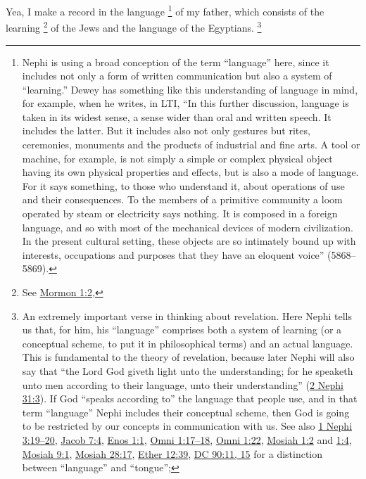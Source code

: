 			Yea, I make a record in the language%
				\footnote{%
					Nephi is using a broad conception of the term ``language'' here, since it includes not only a form of written communication but also a system of ``learning.'' Dewey has something like this understanding of language in mind, for example, when he writes, in LTI, ``In this further discussion, language is taken in its widest sense, a sense wider than oral and written speech. It includes the latter. But it includes also not only gestures but rites, ceremonies, monuments and the products of industrial and fine arts. A tool or machine, for example, is not simply a simple or complex physical object having its own physical properties and effects, but is also a mode of language. For it says something, to those who understand it, about operations of use and their consequences. To the members of a primitive community a loom operated by steam or electricity says nothing. It is composed in a foreign language, and so with most of the mechanical devices of modern civilization. In the present cultural setting, these objects are so intimately bound up with interests, occupations and purposes that they have an eloquent voice'' (5868--5869).
					}
			of my father,
			which consists of the learning%
				\footnote{%
					See \hyperref[MORMON-1-2]{Mormon 1:2}, 
					}
			of the Jews and the language of the Egyptians.%
				\footnote{%
					An extremely important verse in thinking about revelation. Here Nephi tells us that, for him, his ``language'' comprises both a system of learning (or a conceptual scheme, to put it in philosophical terms) and an actual language. This is fundamental to the theory of revelation, because later Nephi will also say that ``the Lord God giveth light unto the understanding; for he speaketh unto men according to their language, unto their understanding'' (\hyperref[2NEPHI-31-3]{2 Nephi 31:3}). If God ``speaks according to'' the language that people use, and in that term ``language'' Nephi includes their conceptual scheme, then God is going to be restricted by our concepts in communication with us. See also \hyperref[1NEPHI-3-19]{1 Nephi 3:19--20}, \hyperref[JACOB-7-4]{Jacob 7:4}, \hyperref[ENOS-1-1]{Enos 1:1}, \hyperref[OMNI-1-17]{Omni 1:17--18}, \hyperref[OMNI-1-22]{Omni 1:22}, \hyperref[MOSIAH-1-2]{Mosiah 1:2} and \hyperref[MOSIAH-1-4]{1:4}, \hyperref[MOSIAH-9-1]{Mosiah 9:1},  \hyperref[MOSIAH-28-17]{Mosiah 28:17}, \hyperref[ETHER-12-39]{Ether 12:39}, \hyperref[DC90-11]{DC 90:11, 15} for a distinction between ``language'' and ``tongue''; 
					}

